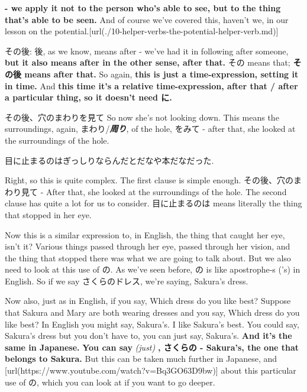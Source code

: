 {\bf - we apply it not to the person who's able to see, but to the thing that's able to be seen.} And of course we've covered this, haven't we, in our lesson on the potential.\goto{{[}10{]}}[url(./10-helper-verbs-the-potential-helper-verb.md)]

{}

その後: 後, as we know, means after - we've had it in following after someone, {\bf but it also means after in the other sense, after that.} その means that; {\bf その後 means after that.} So again, {\bf this is just a time-expression, setting it in time.} And {\bf this time it's a relative time-expression, after that / after a particular thing, so it doesn't need に.}

{}

その後、穴のまわりを見て So now she's not looking down. This means the surroundings, again, まわり/{\bf {\em 周り}}, of the hole, をみて - after that, she looked at the surroundings of the hole.

{}

\thinrule

\startblockquote
目に止まるのはぎっしりならんだとだなや本だなだった.
\stopblockquote

{}

Right, so this is quite complex. The first clause is simple enough. その後、穴のまわり見て - After that, she looked at the surroundings of the hole. The second clause has quite a lot for us to consider. 目に止まるのは means literally the thing that stopped in her eye.

{}

Now this is a similar expression to, in English, the thing that caught her eye, isn't it? Various things passed through her eye, passed through her vision, and the thing that stopped there was what we are going to talk about. But we also need to look at this use of の. As we've seen before, の is like apostrophe-s ('s) in English. So if we say さくらのドレス, we're saying, Sakura's dress.

{}

Now also, just as in English, if you say, Which dress do you like best? Suppose that Sakura and Mary are both wearing dresses and you say, Which dress do you like best? In English you might say, Sakura's. I like Sakura's best. You could say, Sakura's dress but you don't have to, you can just say, Sakura's. {\bf And it's the same in Japanese.} {\bf You can say} {\em (just)} {\bf , さくらの - Sakura's, the one that belongs to Sakura.} But this can be taken much further in Japanese, and [url(https://www.youtube.com/watch?v=Bq3GO63D9bw)] about this particular use of の, which you can look at if you want to go deeper.

